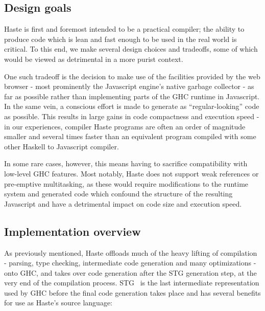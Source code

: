 \documentclass[preprint]{sigplanconf}
\begin{document}
\subsection{Design goals}

Haste is first and foremost intended to be a practical compiler; the ability
to produce code which is lean and fast enough to be used in the real world is
critical. To this end, we make several design choices and tradeoffs, some of
which would be viewed as detrimental in a more purist context.

One such tradeoff is the decision to make use of the facilities provided by the
web browser - most prominently the Javascript engine's native garbage
collector - as far as possible rather than implementing parts of the GHC
runtime in Javascript. In the same vein, a conscious effort is made to generate
as ``regular-looking'' code as possible. This results in large gains in code
compactness and execution speed - in our experiences, compiler Haste programs
are often an order of magnitude smaller and several times faster than an
equivalent program compiled with some other Haskell to Javascript compiler.

In some rare cases, however, this means having to sacrifice compatibility with
low-level GHC features. Most notably, Haste does not support weak references
or pre-emptive multitasking, as these would require modifications to the
runtime system and generated code which confound the structure of the
resulting Javascript and have a detrimental impact on code size and execution
speed.

\subsection{Implementation overview}

As previously mentioned, Haste offloads much of the heavy lifting of
compilation - parsing, type checking, intermediate code generation and many
optimizations - onto GHC, and takes over code generation after the STG
generation step, at the very end of the compilation process. STG\ \cite{stg} is
the last intermediate representation used by GHC before the final code
generation takes place and has several benefits for use as Haste's source
language:
\end{document}
